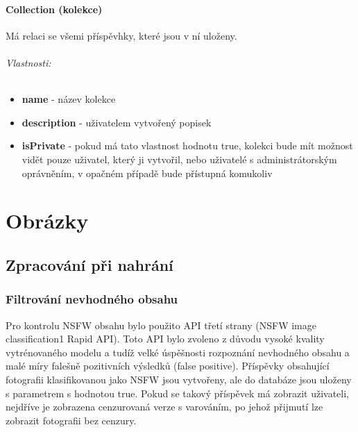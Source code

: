 \documentclass[12pt, a4paper,
 twoside,        %
 openright
]{report}
\newenvironment{propertiesItemize}{
\begin{itemize}{ 
  }}
  {\end{itemize}}
\begin{document}
\subsubsection{Collection (kolekce)} Má relaci  se všemi příspěvhky, které jsou v ní uloženy.
\subparagraph{Vlastnosti:}
\begin{propertiesItemize}
	\item \textbf{name} - název kolekce
	\item \textbf{description} - uživatelem vytvořený popisek
	\item \textbf{isPrivate} - pokud má tato vlastnost hodnotu true, kolekci bude mít možnost vidět pouze uživatel, který ji vytvořil, nebo uživatelé s administrátorským oprávněním, v opačném případě bude přístupná komukoliv
\end{propertiesItemize}




\chapter{Obrázky}
\section{Zpracování při nahrání}
\subsection{Filtrování nevhodného obsahu}\label{section:nsfw_filter}
Pro kontrolu NSFW obsahu bylo použito API třetí strany (NSFW image classification1 Rapid API). Toto API bylo zvoleno z důvodu vysoké kvality vytrénovaného modelu a tudíž velké úspěšnosti rozpoznání nevhodného obsahu a malé míry falešně pozitivních výsledků (false positive). Příspěvky obsahující fotografii klasifikovanou jako NSFW jsou vytvořeny, ale do databáze jsou uloženy s parametrem  s hodnotou true. Pokud se takový příspěvek má zobrazit uživateli, nejdříve je zobrazena cenzurovaná verze s varováním, po jehož přijmutí lze zobrazit fotografii bez cenzury.
\end{document}
